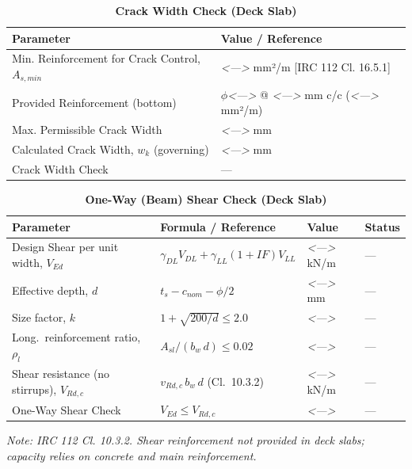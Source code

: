 \documentclass[12pt,a4paper]{report}
\numberwithin{table}{chapter}
\numberwithin{figure}{chapter}
\newcommand{\placeholder}[1]{\textit{\textless #1\textgreater}}
\begin{document}
\vspace{1em}
\clearpage
\begin{longtable}{|L{7cm}|>{\arraybackslash}p{8.5cm}|}
\caption{\textbf{Crack Width Check (Deck Slab)}} \\
\hline
\textbf{Parameter} & \textbf{Value / Reference} \\[6pt]
\hline
\textnormal{Min. Reinforcement for Crack Control, $A_{s,min}$} & \placeholder{---} mm²/m [IRC 112 Cl. 16.5.1] \\[6pt]
\hline
\textnormal{Provided Reinforcement (bottom)} & $\phi$\placeholder{---} @ \placeholder{---} mm c/c (\placeholder{---} mm²/m) \\[6pt]
\hline
\textnormal{Max. Permissible Crack Width} & \placeholder{---} mm \\[6pt]
\hline
\textnormal{Calculated Crack Width, $w_k$ (governing)} & \placeholder{---} mm \\[6pt]
\hline
\textnormal{Crack Width Check} & --- \\[6pt]
\hline
\end{longtable}

\vspace{1em}
\begin{longtable}{|L{5.5cm}|C{3.5cm}|>{\centering\arraybackslash}p{4.5cm}|C{2cm}|}
\caption{\textbf{One-Way (Beam) Shear Check (Deck Slab)}} \\
\hline
\textbf{Parameter} & \textbf{Formula / Reference} & \textbf{Value} & \textbf{Status} \\[6pt]
\hline
Design Shear per unit width, $V_{Ed}$ & $\gamma_{DL} V_{DL} + \gamma_{LL}(1{+}IF)V_{LL}$ & \placeholder{---} kN/m & --- \\[6pt]
\hline
Effective depth, $d$ & $t_s - c_{nom} - \phi/2$ & \placeholder{---} mm & --- \\[6pt]
\hline
Size factor, $k$ & $1 + \sqrt{200/d} \leq 2.0$ & \placeholder{---} & --- \\[6pt]
\hline
Long.\ reinforcement ratio, $\rho_l$ & $A_{sl}/(b_w\,d) \leq 0.02$ & \placeholder{---} & --- \\[6pt]
\hline
Shear resistance (no stirrups), $V_{Rd,c}$ & $v_{Rd,c}\,b_w\,d$ (Cl.\ 10.3.2) & \placeholder{---} kN/m & --- \\[6pt]
\hline
One-Way Shear Check & $V_{Ed} \leq V_{Rd,c}$ & \placeholder{---} & --- \\[6pt]
\hline
\end{longtable}
\noindent\textit{Note: IRC 112 Cl. 10.3.2. Shear reinforcement not provided in deck slabs; capacity relies on concrete and main reinforcement.}
\end{document}
